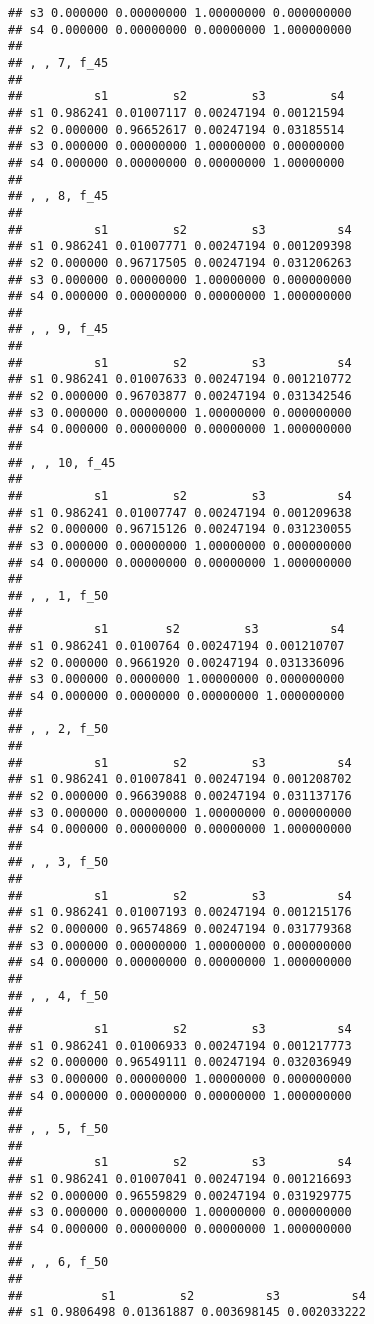 \documentclass[
]{article}
\begin{document}
\begin{verbatim}
## s3 0.000000 0.00000000 1.00000000 0.000000000
## s4 0.000000 0.00000000 0.00000000 1.000000000
## 
## , , 7, f_45
## 
##          s1         s2         s3         s4
## s1 0.986241 0.01007117 0.00247194 0.00121594
## s2 0.000000 0.96652617 0.00247194 0.03185514
## s3 0.000000 0.00000000 1.00000000 0.00000000
## s4 0.000000 0.00000000 0.00000000 1.00000000
## 
## , , 8, f_45
## 
##          s1         s2         s3          s4
## s1 0.986241 0.01007771 0.00247194 0.001209398
## s2 0.000000 0.96717505 0.00247194 0.031206263
## s3 0.000000 0.00000000 1.00000000 0.000000000
## s4 0.000000 0.00000000 0.00000000 1.000000000
## 
## , , 9, f_45
## 
##          s1         s2         s3          s4
## s1 0.986241 0.01007633 0.00247194 0.001210772
## s2 0.000000 0.96703877 0.00247194 0.031342546
## s3 0.000000 0.00000000 1.00000000 0.000000000
## s4 0.000000 0.00000000 0.00000000 1.000000000
## 
## , , 10, f_45
## 
##          s1         s2         s3          s4
## s1 0.986241 0.01007747 0.00247194 0.001209638
## s2 0.000000 0.96715126 0.00247194 0.031230055
## s3 0.000000 0.00000000 1.00000000 0.000000000
## s4 0.000000 0.00000000 0.00000000 1.000000000
## 
## , , 1, f_50
## 
##          s1        s2         s3          s4
## s1 0.986241 0.0100764 0.00247194 0.001210707
## s2 0.000000 0.9661920 0.00247194 0.031336096
## s3 0.000000 0.0000000 1.00000000 0.000000000
## s4 0.000000 0.0000000 0.00000000 1.000000000
## 
## , , 2, f_50
## 
##          s1         s2         s3          s4
## s1 0.986241 0.01007841 0.00247194 0.001208702
## s2 0.000000 0.96639088 0.00247194 0.031137176
## s3 0.000000 0.00000000 1.00000000 0.000000000
## s4 0.000000 0.00000000 0.00000000 1.000000000
## 
## , , 3, f_50
## 
##          s1         s2         s3          s4
## s1 0.986241 0.01007193 0.00247194 0.001215176
## s2 0.000000 0.96574869 0.00247194 0.031779368
## s3 0.000000 0.00000000 1.00000000 0.000000000
## s4 0.000000 0.00000000 0.00000000 1.000000000
## 
## , , 4, f_50
## 
##          s1         s2         s3          s4
## s1 0.986241 0.01006933 0.00247194 0.001217773
## s2 0.000000 0.96549111 0.00247194 0.032036949
## s3 0.000000 0.00000000 1.00000000 0.000000000
## s4 0.000000 0.00000000 0.00000000 1.000000000
## 
## , , 5, f_50
## 
##          s1         s2         s3          s4
## s1 0.986241 0.01007041 0.00247194 0.001216693
## s2 0.000000 0.96559829 0.00247194 0.031929775
## s3 0.000000 0.00000000 1.00000000 0.000000000
## s4 0.000000 0.00000000 0.00000000 1.000000000
## 
## , , 6, f_50
## 
##           s1         s2          s3          s4
## s1 0.9806498 0.01361887 0.003698145 0.002033222

\end{verbatim}
\end{document}
